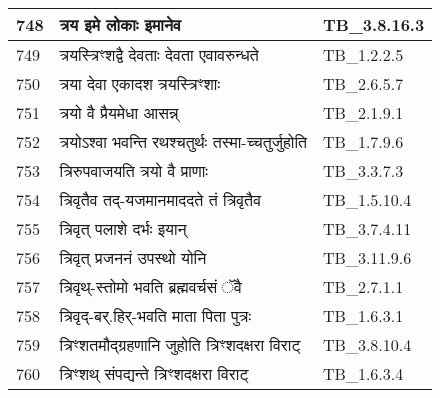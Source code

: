 \documentclass[17pt]{extarticle}
\begin{document}
\begin{longtable}{||p{0.4in}||p{4.9in}||p{0.9in}||}
    748 & त्रय इमे लोकाः इमानेव & TB\_3.8.16.3       \\
    
    \hline
        
    749 & त्रयस्त्रिꣳशद्वै देवताः देवता एवावरुन्धते & TB\_1.2.2.5       \\
    
    \hline
        
    750 & त्रया देवा एकादश त्रयस्त्रिꣳशाः & TB\_2.6.5.7       \\
    
    \hline
        
    751 & त्रयो वै प्रैयमेधा आसन्न् & TB\_2.1.9.1       \\
    
    \hline
        
    752 & त्रयोऽश्वा भवन्ति रथश्चतुर्थः तस्मा{-}च्चतुर्जुहोति & TB\_1.7.9.6       \\
    
    \hline
        
    753 & त्रिरुपवाजयति त्रयो वै प्राणाः & TB\_3.3.7.3       \\
    
    \hline
        
    754 & त्रिवृतैव तद्{-}यजमानमाददते तं त्रिवृतैव & TB\_1.5.10.4       \\
    
    \hline
        
    755 & त्रिवृत् पलाशे दर्भः इयान् & TB\_3.7.4.11       \\
    
    \hline
        
    756 & त्रिवृत् प्रजननं उपस्थो योनि & TB\_3.11.9.6       \\
    
    \hline
        
    757 & त्रिवृथ्{-}स्तोमो भवति ब्रह्मवर्चसं ॅवै & TB\_2.7.1.1       \\
    
    \hline
        
    758 & त्रिवृद्{-}बर्.हिर्{-}भवति माता पिता पुत्रः & TB\_1.6.3.1       \\
    
    \hline
        
    759 & त्रिꣳशतमौद्ग्रहणानि जुहोति त्रिꣳशदक्षरा विराट् & TB\_3.8.10.4       \\
    
    \hline
        
    760 & त्रिꣳशथ् संपद्यन्ते त्रिꣳशदक्षरा विराट् & TB\_1.6.3.4       \\
    

\end{longtable}
\end{document}
